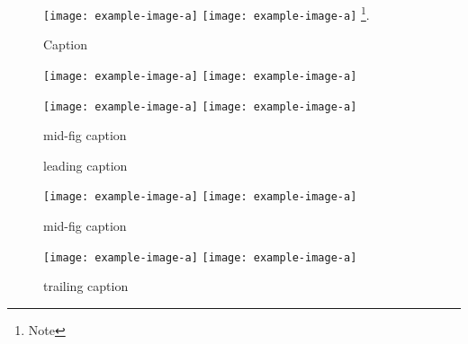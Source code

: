 \documentclass{article}
\begin{document}
\begin{figure}
  \texttt{[image: example-image-a]}\hspace{2cm}%
  \texttt{[image: example-image-a]}%
  \footnote{Note}.
  \caption{Caption}
\end{figure}
\clearpage

\begin{figure}
  \texttt{[image: example-image-a]}\hspace{2cm}%
  \texttt{[image: example-image-a]}\newline
  \caption{mid-fig caption}
  \texttt{[image: example-image-a]}\hspace{2cm}%
  \texttt{[image: example-image-a]}%
\end{figure}
\clearpage

\begin{figure}
  \caption{leading caption}
  \texttt{[image: example-image-a]}\hspace{2cm}%
  \texttt{[image: example-image-a]}\newline
  \caption{mid-fig caption}
  \texttt{[image: example-image-a]}\hspace{2cm}%
  \texttt{[image: example-image-a]}%
  \caption{trailing caption}
\end{figure}
\clearpage
\end{document}
